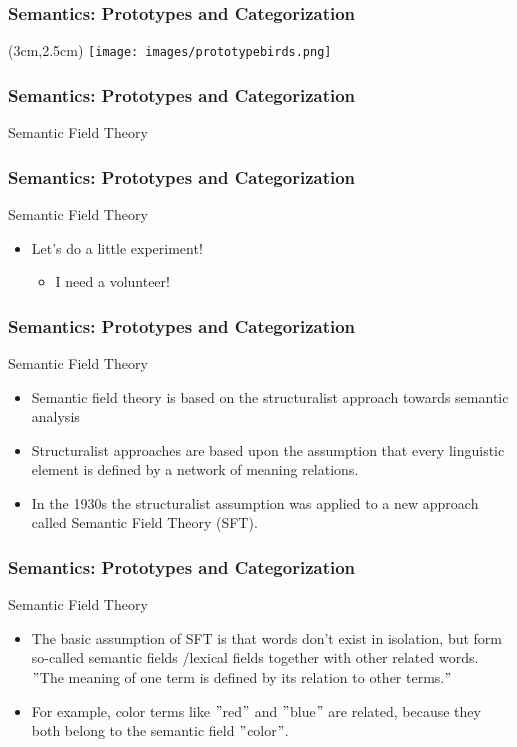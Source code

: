 \documentclass[12pt, table]{beamer}
\begin{document}
\begin{frame}
\frametitle{Semantics: Prototypes and Categorization}
\begin{textblock*}{1cm}(3cm,2.5cm)
\texttt{[image: images/prototypebirds.png]}
\end{textblock*}
\end{frame}

\begin{frame}
\frametitle{Semantics: Prototypes and Categorization}
Semantic Field Theory
\end{frame}

\begin{frame}
\frametitle{Semantics: Prototypes and Categorization}
Semantic Field Theory
\begin{itemize}
\item Let's do a little experiment!
\begin{itemize}
\item I need a volunteer!
\end{itemize}
\end{itemize}
\end{frame}

\begin{frame}
\frametitle{Semantics: Prototypes and Categorization}
Semantic Field Theory
\begin{itemize}
\item Semantic field theory  is based on the structuralist approach towards semantic analysis 
\item Structuralist approaches are based upon the assumption that every linguistic element is defined by a network of meaning relations.
\item In the 1930s the structuralist assumption was applied to a new approach called Semantic Field Theory (SFT).
\end{itemize}
\end{frame}

\begin{frame}
\frametitle{Semantics: Prototypes and Categorization}
Semantic Field Theory
\begin{itemize}
\item The basic assumption of SFT is that words don't exist in isolation, but form so-called semantic fields /lexical fields together with other related words.\\[.5cm]
$"$The meaning of one term is defined by its relation to other terms.$"$\\[.5cm]
\item For example, color terms like $"$red$"$ and $"$blue$"$ are related, because they both belong to the semantic field $"$color$"$.
\end{itemize}
\end{frame}
\end{document}
